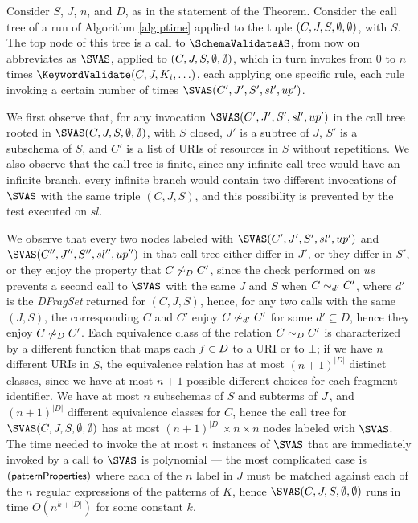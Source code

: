 \begin{appendixproof}
Consider $S$, $J$, $n$, and $D$, as in the statement of the Theorem.
Consider the call tree of a run of Algorithm \ref{alg:ptime} applied to the tuple $(C,J,S,\ES,\ES)$, with $S$.
The top node of this tree is a call to $\SchemaValidateAS$, from now on abbreviates as
$\SVAS$, applied to $(C,J,S,\ES,\ES)$,
which in turn invokes from 0 to $n$ times
$\KeywordValidate(C,J,K_i,\ldots)$, each applying one specific rule, 
each rule invoking a certain number of times  $\SVAS(C',J',S',sl',up')$.

We first observe that, for any invocation $\SVAS(C',J',S',sl',up')$ 
in the call tree rooted in $\SVAS(C,J,S,\ES,\ES)$, with $S$ closed,
$J'$ is a subtree of $J$, $S'$ is a subschema of $S$, and $C'$ is a list of URIs of resources in
$S$ without repetitions.
We also observe that the call tree is finite, since any infinite call tree would have
an infinite branch, every infinite branch would contain two different invocations of
$\SVAS$ with the same triple $(C,J,S)$, and this possibility is prevented by the
test executed on $sl$.

We observe that every two nodes labeled with $\SVAS(C',J',S',sl',up')$
and $\SVAS(C'',J'',S'',sl'',up'')$ in that call tree either differ in $J'$,
or they differ in $S'$, or they enjoy the property that $\Neqd{C}{C'}{D}$, since the check performed
on $us$ prevents a second call to $\SVAS$ with the same $J$ and $S$ when
$\Eqd{C}{C'}{d'}$, where $d'$ is the \emph{DFragSet} returned for $(C,J,S)$, hence, for any two calls
with the same $(J,S)$, the corresponding $C$ and $C'$ enjoy $\Neqd{C}{C'}{d'}$ for some $d' \subseteq D$,
hence they enjoy $\Neqd{C}{C'}{D}$. 
Each equivalence class of the relation $\Eqd{C}{C'}{D}$ is characterized by a different function that maps each $\key{f}\in D$
to a URI or to $\bot$; if we have $n$ different URIs in $S$, the equivalence relation has at most $(n+1)^{|D|}$
distinct classes, since we have at most $n+1$ possible different choices for each fragment identifier.
We have at most $n$ subschemas of $S$ and subterms of $\J$, and $(n+1)^{|D|}$ different equivalence classes
for $C$, hence the call tree for $\SVAS(C,J,S,\ES,\ES)$ has at most $(n+1)^{|D|}\times n \times n$
nodes labeled with $\SVAS$. The time needed to invoke the at most $n$ instances of
$\SVAS$ that are immediately invoked by a call to $\SVAS$ is polynomial --- 
the most complicated case is $(\rpattProps)$ where each of the $n$ label in $J$ must be matched against
each of the $n$ regular expressions of the patterns of $K$, hence $\SVAS(C,J,S,\ES,\ES)$ runs in time 
$O(n^{k+|D|})$ for some constant $k$.
\end{appendixproof}

